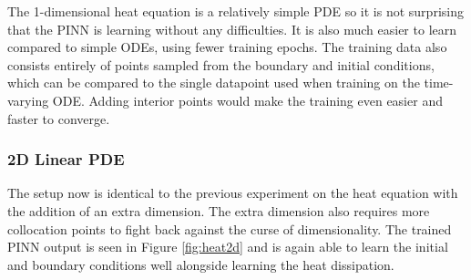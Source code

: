 The 1-dimensional heat equation is a relatively simple PDE so it is not surprising that the PINN is learning without any difficulties. It is also much easier to learn compared to simple ODEs, using fewer training epochs. The training data also consists entirely of points sampled from the boundary and initial conditions, which can be compared to the single datapoint used when training on the time-varying ODE. Adding interior points would make the training even easier and faster to converge.

\subsubsection{2D Linear PDE}

The setup now is identical to the previous experiment on the heat equation with the addition of an extra dimension. The extra dimension also requires more collocation points to fight back against the curse of dimensionality. The trained PINN output is seen in Figure \ref{fig:heat2d} and is again able to learn the initial and boundary conditions well alongside learning the heat dissipation.

